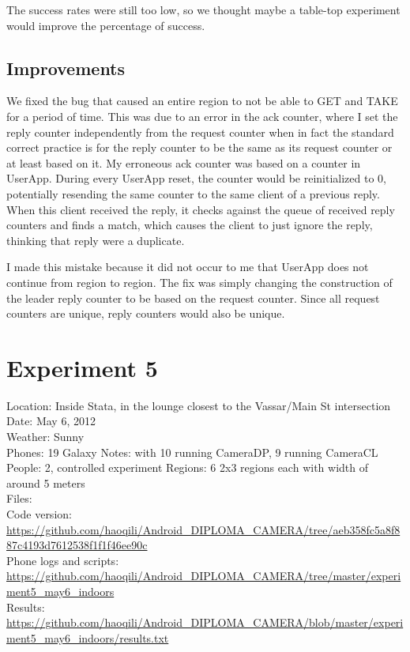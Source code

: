 The success rates were still too low, so we thought maybe a table-top experiment would improve the percentage of success.

\subsection{Improvements}

We fixed the bug that caused an entire region to not be able to GET and TAKE for a period of time. This was due to an error in the ack counter, where I set the reply counter independently from the request counter when in fact the standard correct practice is for the reply counter to be the same as its request counter or at least based on it. My erroneous ack counter was based on a counter in UserApp. During every UserApp reset, the counter would be reinitialized to 0, potentially resending the same counter to the same client of a previous reply. When this client received the reply, it checks against the queue of received reply counters and finds a match, which causes the client to just ignore the reply, thinking that reply were a duplicate.

I made this mistake because it did not occur to me that UserApp does not continue from region to region. The fix was simply changing the construction of the leader reply counter to be based on the request counter. Since all request counters are unique, reply counters would also be unique.

\section{Experiment 5}

Location: Inside Stata, in the lounge closest to the Vassar/Main St intersection\\
Date: May 6, 2012\\
Weather: Sunny\\
Phones: 19 Galaxy Notes: with 10 running CameraDP, 9 running CameraCL\\
People: 2, controlled experiment
Regions: 6 2x3 regions each with width of around 5 meters\\
Files:\\
Code version: {\url{https://github.com/haoqili/Android_DIPLOMA_CAMERA/tree/aeb358fc5a8f887c4193d7612538f1f1f46ee90c}}\\
Phone logs and scripts: {\url{https://github.com/haoqili/Android_DIPLOMA_CAMERA/tree/master/experiment5_may6_indoors}}\\ 
Results: {\url{https://github.com/haoqili/Android_DIPLOMA_CAMERA/blob/master/experiment5_may6_indoors/results.txt}}\\

